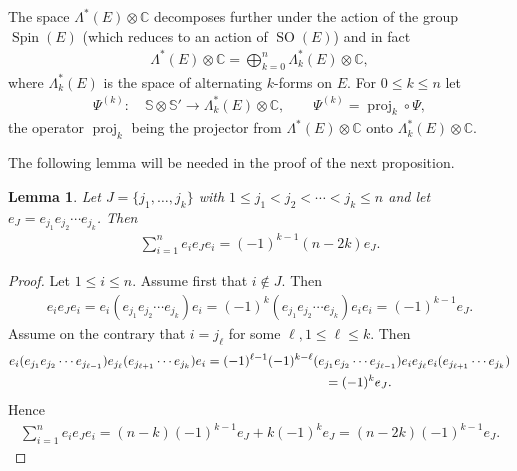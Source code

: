 \documentclass[10pt,a4paper]{amsart}
\DeclareMathOperator{\Spin}{Spin}
\DeclareMathOperator{\proj}{proj}
\DeclareMathOperator{\SO}{SO}
\numberwithin{equation}{section}
\newtheorem{lem}[theor]{Lemma}
\begin{document}
The space $\Lambda^*(E)\otimes \mathbb C$ decomposes further under the action of the group $\Spin(E)$ (which reduces to an action of $\SO(E)$) and in fact
\begin{gather*}
\Lambda^*(E)\otimes \mathbb C= \bigoplus_{k=0}^n \Lambda^*_k(E)\otimes \mathbb C,
\end{gather*}
where $\Lambda^*_k(E)$ is the space of alternating $k$-forms on $E$.
For $0\leq k\leq n$ let
\begin{gather*}
\Psi^{(k)} \colon\quad \mathbb S\otimes \mathbb S' \to \Lambda^*_k(E)\otimes \mathbb C,\qquad
\Psi^{(k)}= \proj_k\circ \Psi,
\end{gather*}
the operator $\proj_k$ being the projector from $\Lambda^*(E) \otimes \mathbb C$ onto $\Lambda^*_k(E)\otimes \mathbb C$.

The following lemma will be needed in the proof of the next proposition.
\begin{lem}
Let $J=\{j_1,\ldots, j_k \}$ with $1\leq j_1<j_2<\cdots <j_k\leq n$ and let
$e_J = e_{j_1}e_{j_2} \cdots e_{j_k}$. Then
\begin{gather}\label{sumeiei}
 \sum_{i=1}^{n}e_i e_J e_i = (-1)^{k-1} (n-2k) e_J .
\end{gather}
\end{lem}

\begin{proof}
Let $1\leq i\leq n$. Assume first that $i\notin J$. Then
\begin{gather*}
e_ie_Je_i = e_i (e_{j_1} e_{j_2} \cdots e_{j_k}) e_i= (-1)^k (e_{j_1} e_{j_2} \cdots e_{j_k}) e_i e_i= (-1)^{k-1} e_J .
\end{gather*}
Assume on the contrary that $i=j_\ell$ for some $\ell, 1\leq \ell \leq k$. Then
\begin{gather*}
e_i (e_{j_1} e_{j_2} \cdots e_{j_{\ell-1}}) e_{j_\ell} (e_{j_{\ell+1}} \cdots e_{j_k} ) e_i
= (-1)^{\ell-1} (-1)^{k-\ell}(e_{j_1} e_{j_2} \cdots e_{j_{\ell-1}}) e_ie_{j_\ell} e_i(e_{j_{\ell+1}} \cdots e_{j_k} )
\\ \hphantom{e_i (e_{j_1} e_{j_2} \cdots e_{j_{\ell-1}}) e_{j_\ell} (e_{j_{\ell+1}} \cdots e_{j_k} ) e_i}
{}= (-1)^k e_J .
\end{gather*}
Hence
\begin{gather*}
\sum_{i=1}^{n} e_ie_Je_i = (n-k) (-1)^{k-1} e_J+ k(-1)^k e_J
= (n-2k)(-1)^{k-1} e_J . \tag*{\qed}
\end{gather*}
\renewcommand{\qed}{}
\end{proof}
\end{document}
